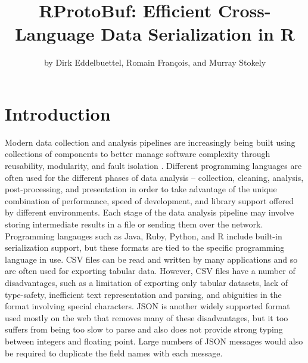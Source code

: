 \title{RProtoBuf: Efficient Cross-Language Data Serialization in R}
\author{by Dirk Eddelbuettel, Romain Fran\c{c}ois, and Murray Stokely}

\maketitle



\section{Introduction}

Modern data collection and analysis pipelines are increasingly being
built using collections of components to better manage software
complexity through reusability, modularity, and fault
isolation \citep{Wegiel:2010:CTT:1932682.1869479}.  Different
programming languages are often used for the different phases of data
analysis -- collection, cleaning, analysis, post-processing, and
presentation in order to take advantage of the unique combination of 
performance, speed of development, and library support offered by
different environments.  Each stage of the data
analysis pipeline may involve storing intermediate results in a
file or sending them over the network.  Programming langauges such as
Java, Ruby, Python, and R include built-in serialization support, but
these formats are tied to the specific programming language in use.
CSV files can be read and written by many applications and so are
often used for exporting tabular data.  However, CSV files have a
number of disadvantages, such as a limitation of exporting only
tabular datasets, lack of type-safety, inefficient text representation
and parsing, and abiguities in the format involving special
characters.  JSON is another widely supported format used mostly on
the web that removes many of these disadvantages, but it too suffers
from being too slow to parse and also does not provide strong typing
between integers and floating point.  Large numbers of JSON messages
would also be required to duplicate the field names with each message.

